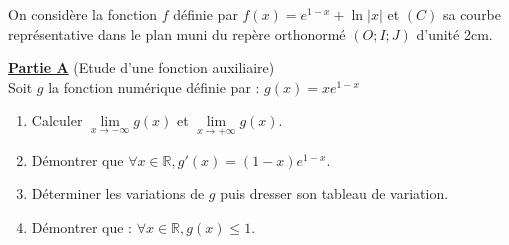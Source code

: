\documentclass[12pt,a4paper]{article}
\begin{document}
\noindent On considère la fonction $f$ définie par $f(x) = e^{1-x} + \ln |x|$ et $(C)$ sa courbe représentative dans le plan muni du repère orthonormé $(O ; I ; J)$ d'unité 2cm.

\vspace{0.3cm}

\noindent \underline{\textbf{Partie A}} (Etude d'une fonction auxiliaire) \\
Soit $g$ la fonction numérique définie par : $g(x) = x e^{1-x}$
\begin{enumerate}
    \item Calculer $\lim\limits_{x \to -\infty} g(x)$ et $\lim\limits_{x \to +\infty} g(x)$.
    \item Démontrer que $\forall x \in \mathbb{R}, g'(x) = (1-x)e^{1-x}$.
    \item Déterminer les variations de $g$ puis dresser son tableau de variation.
    \item Démontrer que : $\forall x \in \mathbb{R}, g(x) \le 1$.
\end{enumerate}

\vspace{0.3cm}
\end{document}
